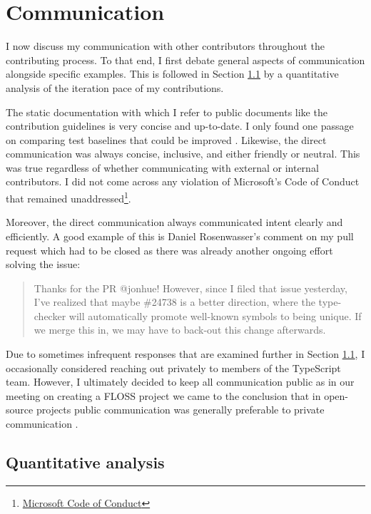 \documentclass[12pt]{scrartcl}
\begin{document}
\section{Communication}

I now discuss my communication with other contributors throughout the contributing process. To that end, I first debate general aspects of communication alongside specific examples. This is followed in Section \ref{quantitative_analysis} by a quantitative analysis of the iteration pace of my contributions.

The static documentation with which I refer to public documents like the contribution guidelines is very concise and up-to-date. I only found one passage on comparing test baselines that could be improved \cite{41991}. Likewise, the direct communication was always concise, inclusive, and either friendly or neutral. This was true regardless of whether communicating with external or internal contributors. I did not come across any violation of Microsoft's Code of Conduct that remained unaddressed\footnote{\href{https://opensource.microsoft.com/codeofconduct/}{Microsoft Code of Conduct}}.

Moreover, the direct communication always communicated intent clearly and efficiently. A good example of this is Daniel Rosenwasser's comment on my pull request which had to be closed as there was already another ongoing effort solving the issue:

\begin{quote}
    Thanks for the PR @jonhue! However, since I filed that issue yesterday, I've realized that maybe \#24738 is a better direction, where the type-checker will automatically promote well-known symbols to being unique. If we merge this in, we may have to back-out this change afterwards. \cite{42530Comment}
\end{quote}

Due to sometimes infrequent responses that are examined further in Section \ref{quantitative_analysis}, I occasionally considered reaching out privately to members of the TypeScript team. However, I ultimately decided to keep all communication public as in our meeting on creating a FLOSS project we came to the conclusion that in open-source projects public communication was generally preferable to private communication \cite{Priv1,13995Comment}.

\subsection{Quantitative analysis}
\label{quantitative_analysis}
\end{document}
